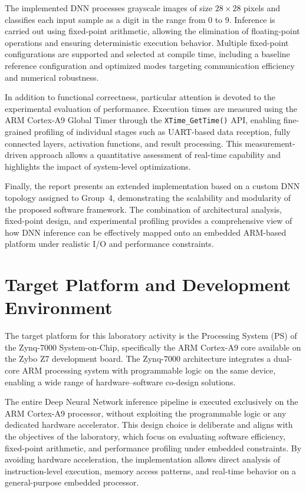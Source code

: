 The implemented DNN processes grayscale images of size $28 \times 28$ pixels and
classifies each input sample as a digit in the range from 0 to 9.
Inference is carried out using fixed-point arithmetic, allowing the elimination of
floating-point operations and ensuring deterministic execution behavior.
Multiple fixed-point configurations are supported and selected at compile time,
including a baseline reference configuration and optimized modes targeting
communication efficiency and numerical robustness.

In addition to functional correctness, particular attention is devoted to the
experimental evaluation of performance.
Execution times are measured using the ARM Cortex-A9 Global Timer through the
\texttt{XTime\_GetTime()} API, enabling fine-grained profiling of individual stages
such as UART-based data reception, fully connected layers, activation functions,
and result processing.
This measurement-driven approach allows a quantitative assessment of real-time
capability and highlights the impact of system-level optimizations.

Finally, the report presents an extended implementation based on a custom DNN
topology assigned to Group~4, demonstrating the scalability and modularity of the
proposed software framework.
The combination of architectural analysis, fixed-point design, and experimental
profiling provides a comprehensive view of how DNN inference can be effectively
mapped onto an embedded ARM-based platform under realistic I/O and performance
constraints.


\chapter{Target Platform and Development Environment}

The target platform for this laboratory activity is the Processing System (PS)
of the Zynq-7000 System-on-Chip, specifically the ARM Cortex-A9 core available on
the Zybo Z7 development board.
The Zynq-7000 architecture integrates a dual-core ARM processing system with
programmable logic on the same device, enabling a wide range of hardware--software
co-design solutions.

The entire Deep Neural Network inference pipeline is executed
exclusively on the ARM Cortex-A9 processor, without exploiting the programmable
logic or any dedicated hardware accelerator.
This design choice is deliberate and aligns with the objectives of the laboratory,
which focus on evaluating software efficiency, fixed-point arithmetic, and
performance profiling under embedded constraints.
By avoiding hardware acceleration, the implementation allows direct analysis of
instruction-level execution, memory access patterns, and real-time behavior on a
general-purpose embedded processor.

